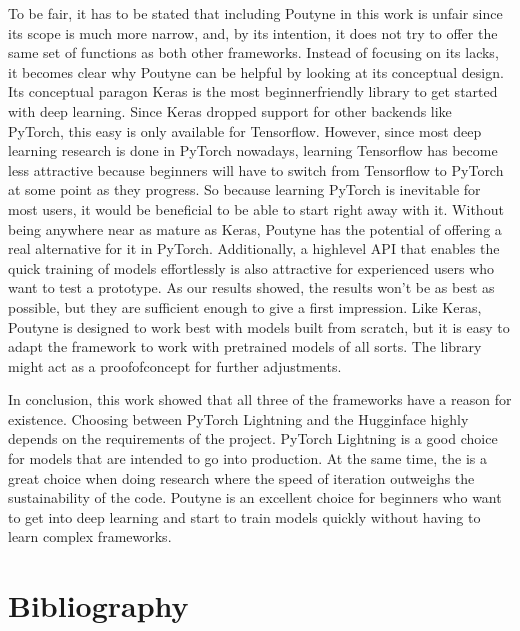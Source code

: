 \documentclass[letterpaper,10pt,english]{jupyterBook}
\begin{document}
\sphinxAtStartPar
To be fair, it has to be stated that including Poutyne in this work is unfair since its scope is much more narrow, and, by its intention, it does not try to offer the same set of functions as both other frameworks.
Instead of focusing on its lacks, it becomes clear why Poutyne can be helpful by looking at its conceptual design.
Its conceptual paragon Keras is the most beginner\sphinxhyphen{}friendly library to get started with deep learning.
Since Keras dropped support for other backends like PyTorch, this easy is only available for Tensorflow.
However, since most deep learning research is done in PyTorch nowadays, learning Tensorflow has become less attractive because beginners will have to switch from Tensorflow to PyTorch at some point as they progress.
So because learning PyTorch is inevitable for most users, it would be beneficial to be able to start right away with it.
Without being anywhere near as mature as Keras, Poutyne has the potential of offering a real alternative for it in PyTorch.
Additionally, a high\sphinxhyphen{}level API that enables the quick training of models effortlessly is also attractive for experienced users who want to test a prototype.
As our results showed, the results won’t be as best as possible, but they are sufficient enough to give a first impression.
Like Keras, Poutyne is designed to work best with models built from scratch, but it is easy to adapt the framework to work with pretrained models of all sorts.
The library  might act as a proof\sphinxhyphen{}of\sphinxhyphen{}concept for further adjustments.

\sphinxAtStartPar
In conclusion, this work showed that all three of the frameworks have a reason for existence. Choosing between PyTorch Lightning and the Hugginface  highly depends on the requirements of the project. PyTorch Lightning is a good choice for models that are intended to go into production. At the same time, the  is a great choice when doing research where the speed of iteration outweighs the sustainability of the code.
Poutyne is an excellent choice for beginners who want to get into deep learning and start to train models quickly without having to learn complex frameworks.


\chapter{Bibliography}
\label{\detokenize{Bibliography:bibliography}}\label{\detokenize{Bibliography::doc}}
\sphinxAtStartPar
\end{document}

